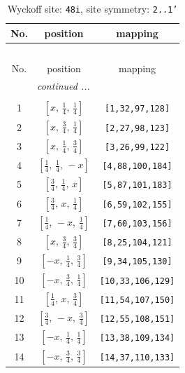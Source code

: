 \documentclass[fleqn,8pt]{jsarticle}
\begin{document}
\begin{longtable}{ccc}
\caption{Wyckoff site: {\tt 48i}, site symmetry: {\tt 2..1'}}
 \\
 \hline \hline
No. & position & mapping \\ \hline \endfirsthead

\multicolumn{2}{l}{\tablename\ \thetable{}} \\
 \hline \hline
No. & position & mapping \\ \hline \endhead

 \hline \hline
\multicolumn{2}{r}{\footnotesize\it continued ...} \\ \endfoot

 \hline \hline
\multicolumn{2}{r}{} \\ \endlastfoot

1 & $\left[ x,\, \frac{1}{4},\, \frac{1}{4} \right]$ & {\tt [1,32,97,128]} \\ \hline
2 & $\left[ x,\, \frac{3}{4},\, \frac{1}{4} \right]$ & {\tt [2,27,98,123]} \\ \hline
3 & $\left[ x,\, \frac{1}{4},\, \frac{3}{4} \right]$ & {\tt [3,26,99,122]} \\ \hline
4 & $\left[ \frac{1}{4},\, \frac{1}{4},\, - x \right]$ & {\tt [4,88,100,184]} \\ \hline
5 & $\left[ \frac{3}{4},\, \frac{1}{4},\, x \right]$ & {\tt [5,87,101,183]} \\ \hline
6 & $\left[ \frac{3}{4},\, x,\, \frac{1}{4} \right]$ & {\tt [6,59,102,155]} \\ \hline
7 & $\left[ \frac{1}{4},\, - x,\, \frac{1}{4} \right]$ & {\tt [7,60,103,156]} \\ \hline
8 & $\left[ x,\, \frac{3}{4},\, \frac{3}{4} \right]$ & {\tt [8,25,104,121]} \\ \hline
9 & $\left[ - x,\, \frac{1}{4},\, \frac{3}{4} \right]$ & {\tt [9,34,105,130]} \\ \hline
10 & $\left[ - x,\, \frac{3}{4},\, \frac{1}{4} \right]$ & {\tt [10,33,106,129]} \\ \hline
11 & $\left[ \frac{1}{4},\, x,\, \frac{3}{4} \right]$ & {\tt [11,54,107,150]} \\ \hline
12 & $\left[ \frac{3}{4},\, - x,\, \frac{3}{4} \right]$ & {\tt [12,55,108,151]} \\ \hline
13 & $\left[ - x,\, \frac{1}{4},\, \frac{1}{4} \right]$ & {\tt [13,38,109,134]} \\ \hline
14 & $\left[ - x,\, \frac{3}{4},\, \frac{3}{4} \right]$ & {\tt [14,37,110,133]} \\ \hline

\end{longtable}
\end{document}
